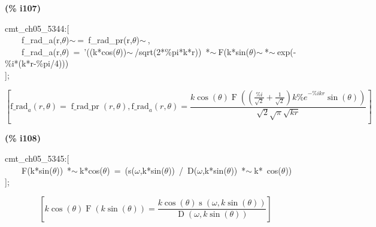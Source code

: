 \documentclass[fleqn]{article}
\begin{document}
\noindent
\begin{minipage}[t]{4.000000em}\color{red}\bfseries
(\% i107)	
\end{minipage}
\begin{minipage}[t]{\textwidth}\color{blue}
cmt\_ch05\_5344:[\\
\ \ \ \ f\_rad\_a(r,\ensuremath{\theta})\ensuremath{\sim\ }=\ f\_rad\_pr(r,\ensuremath{\theta})\ensuremath{\sim\ },\ \\
\ \ \ \ f\_rad\_a(r,\ensuremath{\theta})\ =\ '((k*cos(\ensuremath{\theta}))\ensuremath{\sim\ }/sqrt(2*\%pi*k*r))\ *\ensuremath{\sim\ }F(k*sin(\ensuremath{\theta})\ensuremath{\sim\ }*\ensuremath{\sim\ }exp(-\%i*(k*r-\%pi/4)))\\
];
\end{minipage}
\[\displaystyle \tag{\% o107} 
\operatorname{[}{{\ensuremath{\mathrm{f\_ rad}}}_a}\left( r\operatorname{,}\theta \right) =\operatorname{f\_ rad\_ pr}\left( r\operatorname{,}\theta \right) \operatorname{,}{{\ensuremath{\mathrm{f\_ rad}}}_a}\left( r\operatorname{,}\theta \right) =
\frac{k \cos{\left( \theta \right) } \operatorname{F}\left( \left( \frac{\% i}{\sqrt{2}}+\frac{1}{\sqrt{2}}\right)  k {{\% e}^{-\% i k r}} \sin{\left( \theta \right) }\right) }{\sqrt{2} \sqrt{\ensuremath{\pi} } \sqrt{k r}}\operatorname{]}\mbox{}
\]


\noindent
\begin{minipage}[t]{4.000000em}\color{red}\bfseries
(\% i108)	
\end{minipage}
\begin{minipage}[t]{\textwidth}\color{blue}
cmt\_ch05\_5345:[\\
\ \ \ \ F(k*sin(\ensuremath{\theta}))\ *\ensuremath{\sim\ }k*cos(\ensuremath{\theta})\ =\ (s(\ensuremath{\omega},k*sin(\ensuremath{\theta}))\ /\ D(\ensuremath{\omega},k*sin(\ensuremath{\theta}))\ *\ensuremath{\sim\ }k*\ cos(\ensuremath{\theta}))\\
];
\end{minipage}
\[\displaystyle \tag{\% o108} 
\left[ k \cos{\left( \theta \right) } \operatorname{F}\left( k \sin{\left( \theta \right) }\right) =\frac{k \cos{\left( \theta \right) } \operatorname{s}\left( \omega \operatorname{,}k \sin{\left( \theta \right) }\right) }{\operatorname{D}\left( \omega \operatorname{,}k \sin{\left( \theta \right) }\right) }\right] \mbox{}
\]
\end{document}
